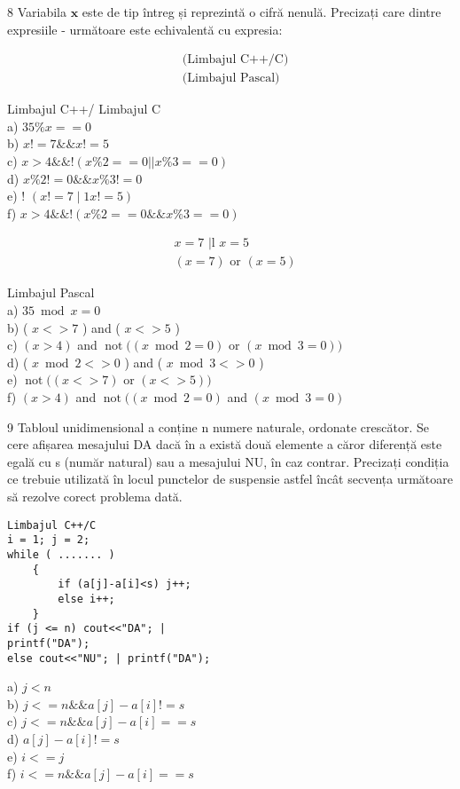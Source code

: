 8 Variabila $\mathbf{x}$ este de tip întreg și reprezintă o cifră nenulă. Precizați care dintre expresiile - următoare este echivalentă cu expresia:

$$
\begin{aligned}
& \text { (Limbajul C++/C) } \\
& \text { (Limbajul Pascal) }
\end{aligned}
$$

Limbajul C++/ Limbajul C\\
a) $35 \% x==0$\\
b) $x!=7 \& \& x!=5$\\
c) $x>4 \& \&!(x \% 2==0| | x \% 3==0)$\\
d) $x \% 2!=0 \& \& x \% 3!=0$\\
e) ! $(x!=7 \mid 1 x!=5)$\\
f) $x>4 \& \&!(x \% 2==0 \& \& x \% 3==0)$

$$
\begin{aligned}
& x=7 \text { |l } x=5 \\
& (x=7) \text { or }(x=5)
\end{aligned}
$$

Limbajul Pascal\\
a) $35 \bmod x=0$\\
b) ( $x<>7$ ) and ( $x<>5$ )\\
c) $(x>4)$ and $\operatorname{not}((x \bmod 2=0)$ or $(x \bmod 3=0))$\\
d) ( $x \bmod 2<>0$ ) and ( $x \bmod 3<>0$ )\\
e) $\operatorname{not}((x<>7)$ or $(x<>5))$\\
f) $(x>4)$ and $\operatorname{not}((x \bmod 2=0)$ and $(x \bmod 3=0)$

9 Tabloul unidimensional a conține n numere naturale, ordonate crescător. Se cere afișarea mesajului DA dacă în a există două elemente a căror diferență este egală cu s (număr natural) sau a mesajului NU, în caz contrar. Precizați condiția ce trebuie utilizată în locul punctelor de suspensie astfel încât secvența următoare să rezolve corect problema dată.

\begin{verbatim}
Limbajul C++/C
i = 1; j = 2;
while ( ....... )
    {
        if (a[j]-a[i]<s) j++;
        else i++;
    }
if (j <= n) cout<<"DA"; |
printf("DA");
else cout<<"NU"; | printf("DA");
\end{verbatim}

a) $j<n$\\
b) $j<=n \& \& a[j]-a[i]!=s$\\
c) $j<=n \& \& a[j]-a[i]==s$\\
d) $a[j]-a[i]!=s$\\
e) $i<=j$\\
f) $i<=n \& \& a[j]-a[i]==s$

